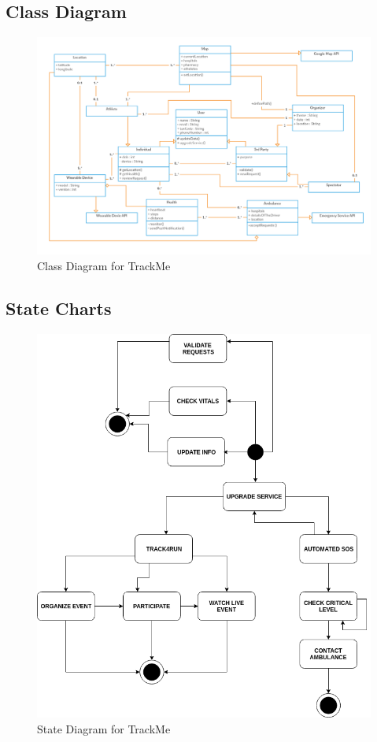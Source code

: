 \subsection{Class Diagram}
\begin{figure}[H]
	\begin{center}	
		\includegraphics[width=\textwidth]{./RASD_Diagrams/ClassDiagram.png}
      	\caption{Class Diagram for TrackMe}
        \label{TrackMe_classdiagram}
	\end{center}
\end{figure}

\subsection{State Charts}
\begin{figure}[H]
	\begin{center}
		\includegraphics[width=\textwidth]{./RASD_Diagrams/StateDiagram.png}
      	\caption{State Diagram for TrackMe}
        \label{TrackMe_statediagram}
	\end{center}
\end{figure}